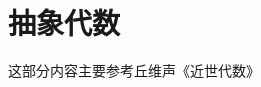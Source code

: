 \newpage
\inmainbodyfalse
\part{抽象代数}\label{抽象代数}
这部分内容主要参考丘维声《近世代数》\cite{丘维声2015近世代数}



\inmainbodytrue







\newpage
\inmainbodyfalse

\inmainbodytrue